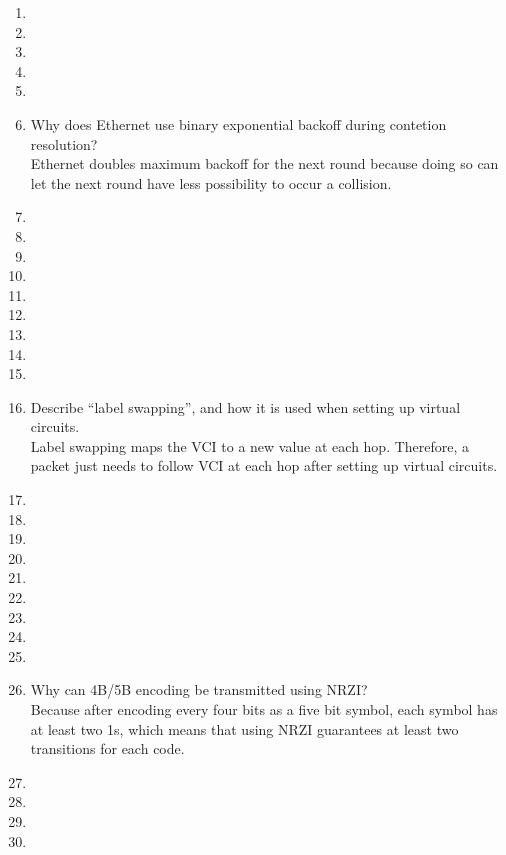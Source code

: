 \documentclass[10pt, a4paper]{article}
\begin{document}
\begin{enumerate}
\item\mbox{}
\item\mbox{}
\item\mbox{}
\item\mbox{}
\item\mbox{}
\item\mbox{} Why does Ethernet use binary exponential backoff during contetion resolution?\\
    \color{blue}
    Ethernet doubles maximum backoff for the next round because doing so can let the next round have less possibility to occur a collision.
    \color{black}
\item\mbox{}
\item\mbox{}
\item\mbox{}
\item\mbox{}
\item\mbox{}
\item\mbox{}
\item\mbox{}
\item\mbox{}
\item\mbox{}
\item\mbox{} Describe ``label swapping'', and how it is used when setting up virtual circuits.\\
    \color{blue}
    Label swapping maps the VCI to a new value at each hop. Therefore, a packet just needs to follow VCI at each hop after setting up virtual circuits.
    \color{black}
\item\mbox{}
\item\mbox{}
\item\mbox{}
\item\mbox{}
\item\mbox{}
\item\mbox{}
\item\mbox{}
\item\mbox{}
\item\mbox{}
\item\mbox{} Why can 4B/5B encoding be transmitted using NRZI?\\
    \color{blue}
    Because after encoding every four bits as a five bit symbol, each symbol has at least two 1s, which means that using NRZI guarantees at least two transitions for each code.
    \color{black}
\item\mbox{}
\item\mbox{}
\item\mbox{}
\item\mbox{}

\end{enumerate}
\end{document}
